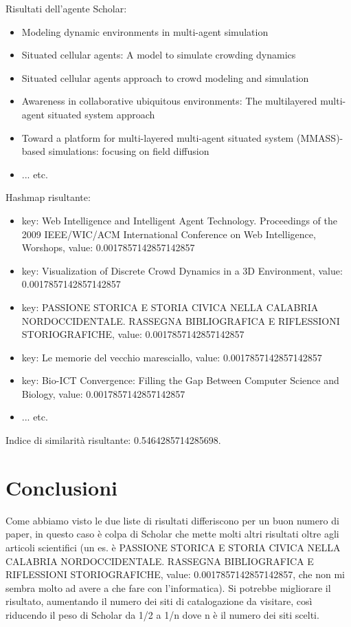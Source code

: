 \documentclass[12pt]{article}
\begin{document}
Risultati dell'agente Scholar:
\begin{itemize}
\item Modeling dynamic environments in multi-agent simulation
\item Situated cellular agents: A model to simulate crowding dynamics
\item Situated cellular agents approach to crowd modeling and simulation
\item Awareness in collaborative ubiquitous environments: The multilayered multi-agent situated system approach
\item Toward a platform for multi-layered multi-agent situated system (MMASS)-based simulations: focusing on field diffusion
\item ... etc.
\end{itemize}

Hashmap risultante:
\begin{itemize}
\item key: Web Intelligence and Intelligent Agent Technology. Proceedings of the 2009 IEEE/WIC/ACM International Conference on Web Intelligence, Worshops, value: 0.0017857142857142857
\item key: Visualization of Discrete Crowd Dynamics in a 3D Environment, value: 0.0017857142857142857
\item key: PASSIONE STORICA E STORIA CIVICA NELLA CALABRIA NORDOCCIDENTALE. RASSEGNA BIBLIOGRAFICA E RIFLESSIONI STORIOGRAFICHE, value: 0.0017857142857142857
\item key: Le memorie del vecchio maresciallo, value: 0.0017857142857142857
\item key: Bio-ICT Convergence: Filling the Gap Between Computer Science and Biology, value: 0.0017857142857142857
\item ... etc.
\end{itemize}

Indice di similarit\`a risultante: 0.5464285714285698.

\section{Conclusioni}
Come abbiamo visto le due liste di risultati differiscono per un buon numero di paper, in questo caso \`e colpa di Scholar che mette molti altri risultati oltre agli articoli scientifici (un es. \`e PASSIONE STORICA E STORIA CIVICA NELLA CALABRIA NORDOCCIDENTALE. RASSEGNA BIBLIOGRAFICA E RIFLESSIONI STORIOGRAFICHE, value: 0.0017857142857142857, che non mi sembra molto ad avere a che fare con l'informatica). Si potrebbe migliorare il risultato, aumentando il numero dei siti di catalogazione da visitare, cos\`i riducendo il peso di Scholar da 1/2 a 1/n dove n \`e il numero dei siti scelti.
\end{document}

